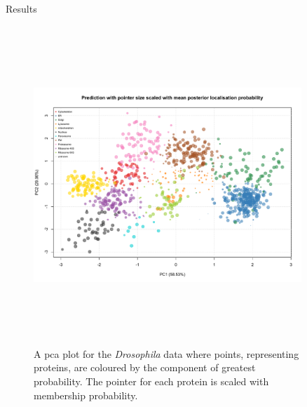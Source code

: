 \documentclass[final, 10pt]{beamer}
\newlength{\sepwid}
\newlength{\onecolwid}
\newlength{\twocolwid}
\begin{document}
\begin{frame}[t]
\begin{columns}[t]
\begin{column}{\twocolwid}
\begin{columns}[t,totalwidth=\twocolwid]
\begin{column}{\onecolwid}
\begin{block}{Results}
  \begin{figure}[h]
  	\centering
  	\includegraphics[width= 20cm, height = 12cm]{gpTanpca}
  	\centering
  	\caption{A pca plot for the \textit{Drosophila} data where points, representing proteins, are coloured by the component of greatest probability. The pointer for each protein is scaled with membership probability.
  	}
  	\label{fig:pcaTan}
  \end{figure}
        
     


      \end{block}

    \end{column} %

  \end{columns} %



\end{column} %

\begin{column}{\sepwid}\end{column} %

\begin{column}{\onecolwid} %


\end{column}
\end{columns}
\end{frame}
\end{document}
